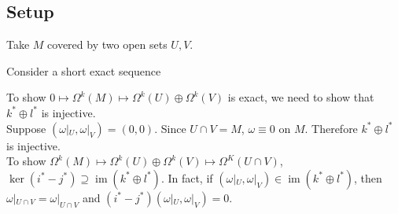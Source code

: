 \documentclass[11pt]{article}
\begin{document}
\subsection*{Setup}
\label{sec:orga741a8d}
Take \(M\) covered by two open sets \(U,V\).\\
Consider a short exact sequence\\
To show \(0\mapsto\Omega^{k}(M)\mapsto\Omega^{k}(U)\oplus\Omega^{k}(V)\) is exact, we need to show that \(k^{*}\oplus l^{*}\) is injective.\\
Suppose \((\omega|_{U},\omega|_{V})=(0,0)\). Since \(U\cap V=M\), \(\omega\equiv 0\) on \(M\). Therefore \(k^{*}\oplus l^{*}\) is injective.\\
To show \(\Omega^{k}(M)\mapsto\Omega^{k}(U)\oplus\Omega^{k}(V)\mapsto\Omega^{K}(U\cap V)\), \(\ker(i^{*}-j^{*})\supseteq\operatorname{im}(k^{*}\oplus l^{*})\). In fact, if \((\omega|_{U},\omega|_{V})\in\operatorname{im}(k^{*}\oplus l^{*})\), then \(\omega|_{U\cap V}=\omega|_{U\cap V}\) and \((i^{*}-j^{*})(\omega|_{U},\omega|_{V})=0\).\\
\end{document}

